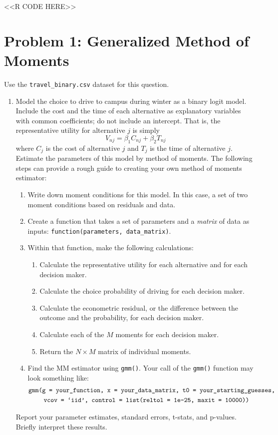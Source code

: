 \documentclass[11pt,letterpaper]{article}
\begin{document}
<<R CODE HERE>>

\section*{Problem 1: Generalized Method of Moments}

Use the \texttt{travel\_binary.csv} dataset for this question.

\begin{enumerate}[label=\alph*., leftmargin=*]
	\item Model the choice to drive to campus during winter as a binary logit model. Include the cost and the time of each alternative as explanatory variables with common coefficients; do not include an intercept. That is, the representative utility for alternative $j$ is simply
	$$V_{nj} = \beta_1 C_{nj} + \beta_2 T_{nj}$$
	where $C_j$ is the cost of alternative $j$ and $T_j$ is the time of alternative $j$. Estimate the parameters of this model by method of moments. The following steps can provide a rough guide to creating your own method of moments estimator:
	\begin{enumerate}[label=\Roman*.]
		\item Write down moment conditions for this model. In this case, a set of two moment conditions based on residuals and data.
		\item Create a function that takes a set of parameters and a \emph{matrix} of data as inputs: \texttt{function(parameters, data\_matrix)}.
		\item Within that function, make the following calculations:
		\begin{enumerate}[label=\roman*.]
			\item Calculate the representative utility for each alternative and for each decision maker.
			\item Calculate the choice probability of driving for each decision maker.
			\item Calculate the econometric residual, or the difference between the outcome and the probability, for each decision maker.
			\item Calculate each of the $M$ moments for each decision maker.
			\item Return the $N \times M$ matrix of individual moments.
		\end{enumerate}
		\item Find the MM estimator using \texttt{gmm()}. Your call of the \texttt{gmm()} function may look something like:
		\begin{align*}
			&\text{\texttt{gmm(g = your\_function, x = your\_data\_matrix, t0 = your\_starting\_guesses, }} \\
			&\qquad~ \text{\texttt{vcov = `iid', control = list(reltol = 1e-25, maxit = 10000))}}
		\end{align*}
	\end{enumerate}
	Report your parameter estimates, standard errors, t-stats, and p-values. Briefly interpret these results.


\end{enumerate}
\end{document}
